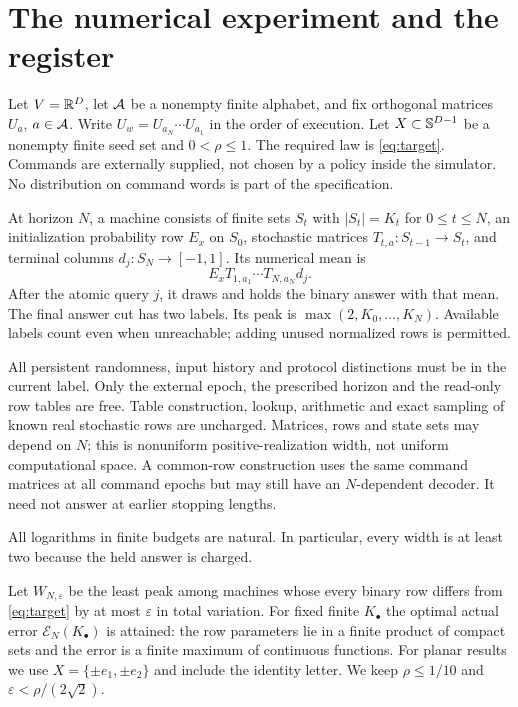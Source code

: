 \section{The numerical experiment and the register}\label{sec:model}
Let $V=\mathbb R^D$, let $\mathcal A$ be a nonempty finite alphabet, and fix orthogonal matrices $U_a$, $a\in\mathcal A$. Write $U_w=U_{a_N}\cdots U_{a_1}$ in the order of execution. Let $X\subset\mathbb S^{D-1}$ be a nonempty finite seed set and $0<\rho\le1$. The required law is \eqref{eq:target}. Commands are externally supplied, not chosen by a policy inside the simulator. No distribution on command words is part of the specification.

\begin{definition}\label{def:machine}
At horizon $N$, a machine consists of finite sets $S_t$ with $|S_t|=K_t$ for $0\le t\le N$, an initialization probability row $E_x$ on $S_0$, stochastic matrices $T_{t,a}:S_{t-1}\to S_t$, and terminal columns $d_j:S_N\to[-1,1]$. Its numerical mean is
\[
 E_x T_{1,a_1}\cdots T_{N,a_N}d_j.
\]
After the atomic query $j$, it draws and holds the binary answer with that mean. The final answer cut has two labels. Its peak is $\max(2,K_0,\ldots,K_N)$. Available labels count even when unreachable; adding unused normalized rows is permitted.
\end{definition}

All persistent randomness, input history and protocol distinctions must be in the current label. Only the external epoch, the prescribed horizon and the read-only row tables are free. Table construction, lookup, arithmetic and exact sampling of known real stochastic rows are uncharged. Matrices, rows and state sets may depend on $N$; this is nonuniform positive-realization width, not uniform computational space. A common-row construction uses the same command matrices at all command epochs but may still have an $N$-dependent decoder. It need not answer at earlier stopping lengths.

All logarithms in finite budgets are natural. In particular, every width is at least two because the held answer is charged.

Let $W_{N,\varepsilon}$ be the least peak among machines whose every binary row differs from \eqref{eq:target} by at most $\varepsilon$ in total variation. For fixed finite $K_\bullet$ the optimal actual error $\mathcal E_N(K_\bullet)$ is attained: the row parameters lie in a finite product of compact sets and the error is a finite maximum of continuous functions. For planar results we use $X=\{\pm e_1,\pm e_2\}$ and include the identity letter. We keep $\rho\le1/10$ and $\varepsilon<\rho/(2\sqrt2)$.

